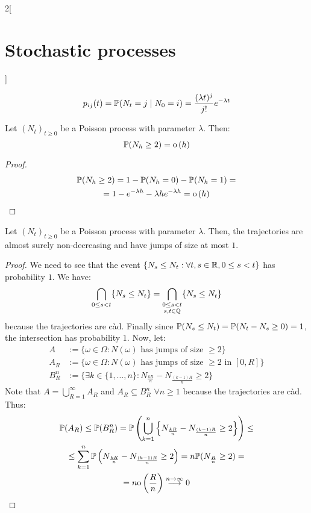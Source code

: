 \documentclass[../../../main_math.tex]{subfiles}
\begin{document}
\begin{multicols}{2}[\section{Stochastic processes}]
\begin{corollary}
    $$
      p_{ij}(t)=\mathbb{P}(N_t=j\mid N_0=i)=\frac{(\lambda t)^j}{j!}e^{-\lambda t}
    $$
  \end{corollary}
  \begin{lemma}
    Let ${(N_t)}_{t\geq 0}$ be a Poisson process with parameter $\lambda$. Then: $$\mathbb{P}(N_h\geq 2)=\mathrm{o}\left(h\right)$$
  \end{lemma}
  \begin{proof}
    \begin{multline*}
      \mathbb{P}(N_h\geq 2)=1-\mathbb{P}(N_h=0)-\mathbb{P}(N_h=1)=\\
      =1-e^{-\lambda h}-\lambda h e^{-\lambda h}=\mathrm{o}\left(h\right)
    \end{multline*}
  \end{proof}
  \begin{proposition}
    Let ${(N_t)}_{t\geq 0}$ be a Poisson process with parameter $\lambda$. Then, the trajectories are almost surely non-decreasing and have jumps of size at most $1$.
  \end{proposition}
  \begin{proof}
    We need to see that the event $\{N_s\leq N_t: \forall t,s\in\mathbb{R}, 0\leq s < t\}$ has probability $1$. We have:
    $$
      \bigcap_{0\leq s < t}\{N_s\leq N_t\}= \bigcap_{\substack{0\leq s < t\\s,t\in\mathbb{Q}}}\{N_s\leq N_t\}
    $$
    because the trajectories are càd. Finally since $\mathbb{P}(N_s\leq N_t)=\mathbb{P}(N_t-N_s\geq 0)=1$, the intersection has probability $1$. Now, let:
    \begin{align*}
      A     & :=\{\omega\in\Omega:N(\omega)\text{ has jumps of size }\geq 2\}                   \\
      A_R   & :=\{\omega\in\Omega:N(\omega)\text{ has jumps of size }\geq 2\text{ in $[0,R]$}\} \\
      B_R^n & :=\{\exists k\in\{1,\ldots,n\}: N_{\frac{kR}{n}}-N_{\frac{(k-1)R}{n}}\geq 2\}
    \end{align*}
    Note that $A=\bigcup_{R=1}^\infty A_R$ and $A_R\subseteq B_R^n$ $\forall n\geq 1$ because the trajectories are càd. Thus:
    \begin{multline*}
      \mathbb{P}(A_R)\leq \mathbb{P}(B_R^n)=\mathbb{P}\left(\bigcup_{k=1}^n\left\{N_{\frac{kR}{n}}-N_{\frac{(k-1)R}{n}}\geq 2\right\}\right)\leq\\
      \leq\sum_{k=1}^n\mathbb{P}\left(N_{\frac{kR}{n}}-N_{\frac{(k-1)R}{n}}\geq 2\right)=n\mathbb{P}(N_{\frac{R}{n}}\geq 2)=\\=n\mathrm{o}\left(\frac{R}{n}\right)\overset{n\to\infty}{\longrightarrow}0
    \end{multline*}

\end{proof}
\end{multicols}
\end{document}
